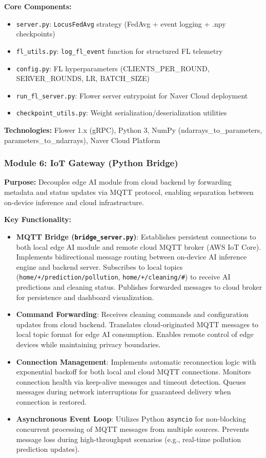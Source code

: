 \documentclass[conference]{IEEEtran}
\begin{document}
\textbf{Core Components:}
\begin{itemize}
    \item \texttt{server.py}: \texttt{LocusFedAvg} strategy (FedAvg + event logging + .npy checkpoints)
    \item \texttt{fl\_utils.py}: \texttt{log\_fl\_event} function for structured FL telemetry
    \item \texttt{config.py}: FL hyperparameters (CLIENTS\_PER\_ROUND, SERVER\_ROUNDS, LR, BATCH\_SIZE)
    \item \texttt{run\_fl\_server.py}: Flower server entrypoint for Naver Cloud deployment
    \item \texttt{checkpoint\_utils.py}: Weight serialization/deserialization utilities
\end{itemize}

\textbf{Technologies:} Flower 1.x (gRPC), Python 3, NumPy (ndarrays\_to\_parameters, parameters\_to\_ndarrays), Naver Cloud Platform

\subsubsection{Module 6: IoT Gateway (Python Bridge)}

\textbf{Purpose:} Decouples edge AI module from cloud backend by forwarding metadata and status updates via MQTT protocol, enabling separation between on-device inference and cloud infrastructure.

\textbf{Key Functionality:}
\begin{itemize}
    \item \textbf{MQTT Bridge (\texttt{bridge\_server.py})}: Establishes persistent connections to both local edge AI module and remote cloud MQTT broker (AWS IoT Core). Implements bidirectional message routing between on-device AI inference engine and backend server. Subscribes to local topics (\texttt{home/+/prediction/pollution}, \texttt{home/+/cleaning/\#}) to receive AI predictions and cleaning status. Publishes forwarded messages to cloud broker for persistence and dashboard visualization.
    \item \textbf{Command Forwarding}: Receives cleaning commands and configuration updates from cloud backend. Translates cloud-originated MQTT messages to local topic format for edge AI consumption. Enables remote control of edge devices while maintaining privacy boundaries.
    \item \textbf{Connection Management}: Implements automatic reconnection logic with exponential backoff for both local and cloud MQTT connections. Monitors connection health via keep-alive messages and timeout detection. Queues messages during network interruptions for guaranteed delivery when connection is restored.
    \item \textbf{Asynchronous Event Loop}: Utilizes Python \texttt{asyncio} for non-blocking concurrent processing of MQTT messages from multiple sources. Prevents message loss during high-throughput scenarios (e.g., real-time pollution prediction updates).
\end{itemize}
\end{document}
